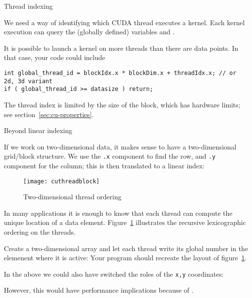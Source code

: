  {Thread indexing}

We need a way of identifying which CUDA thread executes a kernel.
Each kernel execution can query the (globally defined) variables
 and .

It is possible to launch a kernel on more threads than
there are data points. In that case, your code could include
\begin{lstlisting}
int global_thread_id = blockIdx.x * blockDim.x + threadIdx.x; // or 2d, 3d variant
if ( global_thread_id >= datasize ) return;
\end{lstlisting}

The thread index is limited by the size of the block, which has
hardware limits; see section~\ref{sec:cu-properties}.

 {Beyond linear indexing}

If we work on two-dimensional data, it makes sense to have
a two-dimensional grid/block structure.
We use the \lstinline{.x} component to find the row,
and \lstinline{.y} component for the column;
this is then translated to a linear index:
%

\begin{figure}[ht]
  \texttt{[image: cuthreadblock]}
  \caption{Two-dimensional thread ordering}
  \label{fig:cu-thread-block}
\end{figure}
In many applications it is enough to know that each thread can
compute the unique location of a data element.
Figure~\ref{fig:cu-thread-block} illustrates the recursive
lexicographic ordering on the threads.

\begin{exercise}
  \label{ex:print2b2}
  Create a two-dimensional array and let each thread write its global number
  in the elemenent where it is active:
  Your program should recreate the layout of figure~\ref{fig:cu-thread-block}.
\end{exercise}

In the above we could also have switched the roles of the \lstinline{x,y} coordinates:
%

However, this would have performance implications
because of .





